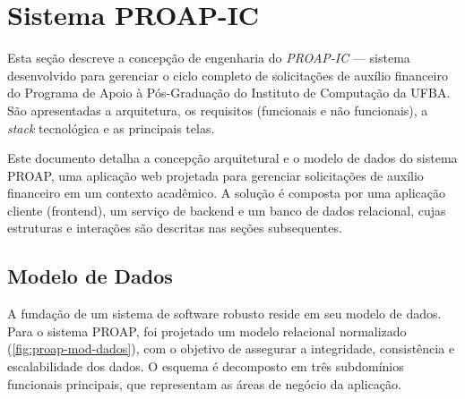 \documentclass[portuguese]{sbc2025}%
\begin{document}

\section{Sistema PROAP-IC}
\label{sec:proap}

Esta seção descreve a concepção de engenharia do \textit{PROAP-IC} — sistema desenvolvido para gerenciar o ciclo completo de solicitações de auxílio financeiro do Programa de Apoio à Pós-Graduação do Instituto de Computação da UFBA. São apresentadas a arquitetura, os requisitos (funcionais e não funcionais), a \textit{stack} tecnológica e as principais telas.



Este documento detalha a concepção arquitetural e o modelo de dados do sistema PROAP, uma aplicação web projetada para gerenciar solicitações de auxílio financeiro em um contexto acadêmico. A solução é composta por uma aplicação cliente (frontend), um serviço de backend e um banco de dados relacional, cujas estruturas e interações são descritas nas seções subsequentes.

\subsection{Modelo de Dados}
\label{sec:modelo-de-dados}
A fundação de um sistema de software robusto reside em seu modelo de dados. Para o sistema PROAP, foi projetado um modelo relacional normalizado (\autoref{fig:proap-mod-dados}), com o objetivo de assegurar a integridade, consistência e escalabilidade dos dados. O esquema é decomposto em três subdomínios funcionais principais, que representam as áreas de negócio da aplicação.
\end{document}
